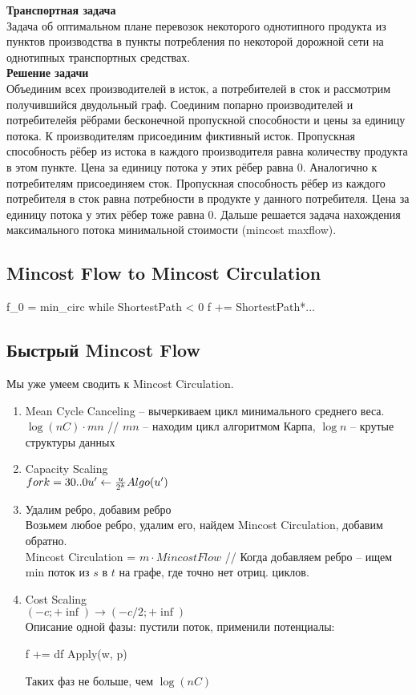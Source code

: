 {\bfseries Транспортная задача} \\
Задача об оптимальном плане перевозок некоторого однотипного продукта из пунктов производства в пункты потребления по некоторой дорожной сети на однотипных транспортных средствах.\\
{\bfseries Решение задачи}\\
Объединим всех производителей в исток, а потребителей в сток и рассмотрим получившийся двудольный граф. Соединим попарно производителей и потребителейя рёбрами бесконечной пропускной способности 
и цены за единицу потока. К производителям присоединим фиктивный исток. Пропускная способность рёбер из истока в каждого производителя равна количеству продукта в этом пункте. Цена за единицу потока 
у этих рёбер равна 0. Аналогично к потребителям присоединяем сток. Пропускная способность рёбер из каждого потребителя в сток равна потребности в продукте у данного потребителя. Цена за единицу потока 
у этих рёбер тоже равна 0. Дальше решается задача нахождения максимального потока минимальной стоимости (mincost maxflow).

\subsection{Mincost Flow to Mincost Circulation}
\begin{cppcode}
	f_0 = min_circ
	while ShortestPath < 0
		f += ShortestPath*...
\end{cppcode}

\subsection{Быстрый Mincost Flow}
Мы уже умеем сводить к Mincost Circulation.\\
\begin{enumerate}
	\item Mean Cycle Canceling -- вычеркиваем цикл минимального среднего веса.\\
	$\log (nC) \cdot mn$ // $mn$ -- находим цикл алгоритмом Карпа, $\log n$ -- крутые структуры данных
	\item Capacity Scaling \\
	$for k = 30..0\\
	u' \gets \frac{u}{2^k}\\
	Algo(u')$ 
	\item Удалим ребро, добавим ребро\\
	Возьмем любое ребро, удалим его, найдем Mincost Circulation, добавим обратно.\\
	Mincost Circulation = $m\cdot Mincost Flow$ // Когда добавляем ребро -- ищем min поток из $s$ в $t$ на графе, где точно нет отриц. циклов.
	\item Cost Scaling\\
	$(-c; +\inf) \to (-c/2; +\inf)$\\
	Описание одной фазы: пустили поток, применили потенциалы:
	\begin{cppcode}
	f += df
	Apply(w, p)
	\end{cppcode}
	\begin{lemma}
	Таких фаз не больше, чем $\log(nC)$
	\end{lemma} 
\end{enumerate}

